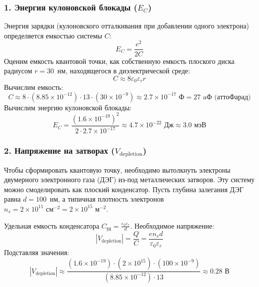 \documentclass[a4paper,14pt]{extreport} %
\begin{document}
\subsubsection*{1. Энергия кулоновской блокады ($E_C$)}
Энергия зарядки (кулоновского отталкивания при добавлении одного электрона) определяется емкостью системы $C$:
\begin{equation}
    E_C = \frac{e^2}{2C}
\end{equation}
Оценим емкость квантовой точки, как собственную емкость плоского диска радиусом $r = 30$~нм, находящегося в диэлектрической среде:
\begin{equation}
    C \approx 8 \varepsilon_0 \varepsilon_r r
\end{equation}
Вычислим емкость:
\begin{equation*}
    C \approx 8 \cdot (8.85 \times 10^{-12}) \cdot 13 \cdot (30 \times 10^{-9}) \approx 2.7 \times 10^{-17} \text{ Ф} = 27 \text{ aФ (аттоФарад)}
\end{equation*}
Вычислим энергию кулоновской блокады:
\begin{equation}
    E_C = \frac{(1.6 \times 10^{-19})^2}{2 \cdot 2.7 \times 10^{-17}} \approx 4.7 \times 10^{-22} \text{ Дж} \approx 3.0 \text{ мэВ}
\end{equation}

\subsubsection*{2. Напряжение на затворах ($V_{\text{depletion}}$)}
Чтобы сформировать квантовую точку, необходимо вытолкнуть электроны двумерного электронного газа (ДЭГ) из-под металлических затворов. Эту систему можно смоделировать как плоский конденсатор. Пусть глубина залегания ДЭГ равна $d = 100$~нм, а типичная плотность электронов $n_s = 2 \times 10^{11} \text{ см}^{-2} = 2 \times 10^{15} \text{ м}^{-2}$.

Удельная емкость конденсатора $C_{\text{уд}} = \frac{\varepsilon_0 \varepsilon_r}{d}$. Необходимое напряжение:
\begin{equation}
    |V_{\text{depletion}}| = \frac{Q}{C} = \frac{e n_s d}{\varepsilon_0 \varepsilon_r}
\end{equation}
Подставляя значения:
\begin{equation}
    |V_{\text{depletion}}| \approx \frac{(1.6 \times 10^{-19}) \cdot (2 \times 10^{15}) \cdot (100 \times 10^{-9})}{(8.85 \times 10^{-12}) \cdot 13} \approx 0.28 \text{ В}
\end{equation}
\end{document}

